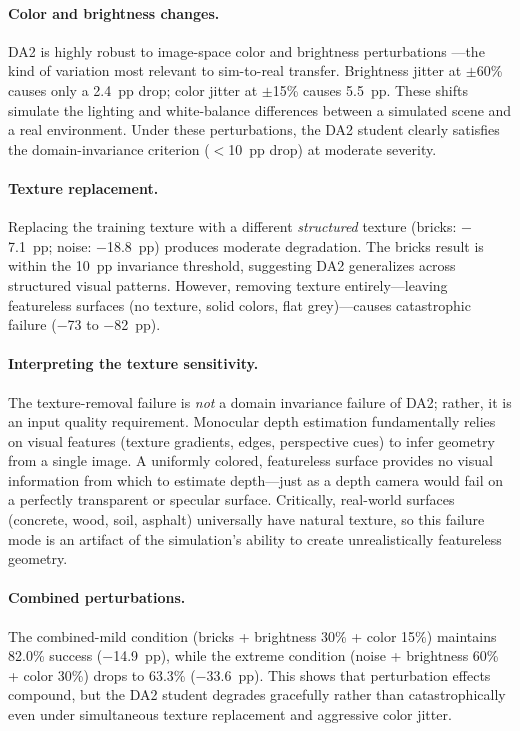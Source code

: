 \documentclass[10pt,twocolumn]{article}
\begin{document}
\paragraph{Color and brightness changes.}
DA2 is highly robust to image-space color and brightness perturbations
---the kind of variation most relevant to sim-to-real transfer.
Brightness jitter at $\pm$60\% causes only a 2.4~pp drop;
color jitter at $\pm$15\% causes 5.5~pp.  These shifts simulate
the lighting and white-balance differences between a simulated
scene and a real environment.  Under these perturbations, the DA2
student clearly satisfies the domain-invariance criterion ($<$10~pp
drop) at moderate severity.

\paragraph{Texture replacement.}
Replacing the training texture with a different \emph{structured}
texture (bricks: $-$7.1~pp; noise: $-$18.8~pp) produces moderate
degradation.  The bricks result is within the 10~pp invariance
threshold, suggesting DA2 generalizes across structured visual
patterns.  However, removing texture entirely---leaving featureless
surfaces (no texture, solid colors, flat grey)---causes catastrophic
failure ($-$73 to $-$82~pp).

\paragraph{Interpreting the texture sensitivity.}
The texture-removal failure is \emph{not} a domain invariance
failure of DA2; rather, it is an input quality requirement.
Monocular depth estimation fundamentally relies on visual features
(texture gradients, edges, perspective cues) to infer geometry from
a single image.  A uniformly colored, featureless surface provides
no visual information from which to estimate depth---just as a
depth camera would fail on a perfectly transparent or specular
surface.  Critically, real-world surfaces (concrete, wood, soil,
asphalt) universally have natural texture, so this failure mode
is an artifact of the simulation's ability to create unrealistically
featureless geometry.

\paragraph{Combined perturbations.}
The combined-mild condition (bricks + brightness 30\% + color 15\%)
maintains 82.0\% success ($-$14.9~pp), while the extreme condition
(noise + brightness 60\% + color 30\%) drops to 63.3\% ($-$33.6~pp).
This shows that perturbation effects compound, but the DA2 student
degrades gracefully rather than catastrophically even under
simultaneous texture replacement and aggressive color jitter.
\end{document}
